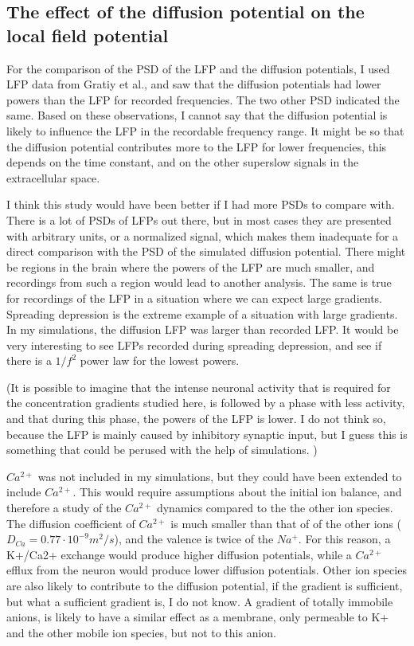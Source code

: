 \documentclass{article}
\begin{document}
\subsection{The effect of the diffusion potential on the local field potential}
For the comparison of the PSD of the LFP and the diffusion potentials, I used LFP data from Gratiy et al., and saw that the diffusion potentials had lower powers than the LFP for recorded frequencies. The two other PSD indicated the same. Based on these observations, I cannot say that the diffusion potential is likely to influence the LFP in the recordable frequency range. It might be so that the diffusion potential contributes more to the LFP for lower frequencies, this depends on the time constant, and on the other superslow signals in the extracellular space.

I think this study would have been better if I had more PSDs to compare with. There is a lot of PSDs of LFPs out there, but in most cases they are presented with arbitrary units, or a normalized signal, which makes them inadequate for a direct comparison with the PSD of the simulated diffusion potential. There might be regions in the brain where the powers of the LFP are much smaller, and recordings from such a region would lead to another analysis. The same is true for recordings of the LFP in a situation where we can expect large gradients. Spreading depression is the extreme  example of a situation with large gradients. In my simulations, the diffusion LFP was larger than recorded LFP. It would be very interesting to see LFPs recorded during spreading depression, and see if there is a $1/f^2$ power law for the lowest powers. 


(It is possible to imagine that the intense neuronal activity that is required for the concentration gradients studied here, is followed by a phase with less activity, and that during this phase, the powers of the LFP is lower. I do not think so, because the LFP is mainly caused by inhibitory synaptic input, but I guess this is something that could be perused with the help of simulations. )


$Ca^{2+}$ was not included in my simulations, but they could have been extended to include $Ca^{2+}$. This would require assumptions about the initial ion balance, and therefore a study of the $Ca^{2+}$ dynamics compared to the the other ion species. The diffusion coefficient of $Ca^{2+}$ is much smaller than that of of the other ions ($D_{Ca} = 0.77 \cdot 10^{-9} m^2/s$), and the valence is twice of the $Na^{+}$. For this reason, a K+/Ca2+ exchange would produce higher diffusion potentials, while a $Ca^{2+}$ efflux from the neuron would produce lower diffusion potentials. Other ion species are also likely to contribute to the diffusion potential, if the gradient is sufficient, but what a sufficient gradient is, I do not know. A gradient of totally immobile anions, is likely to have a similar effect as a membrane, only permeable to K+ and the other mobile ion species, but not to this anion. 
\end{document}
